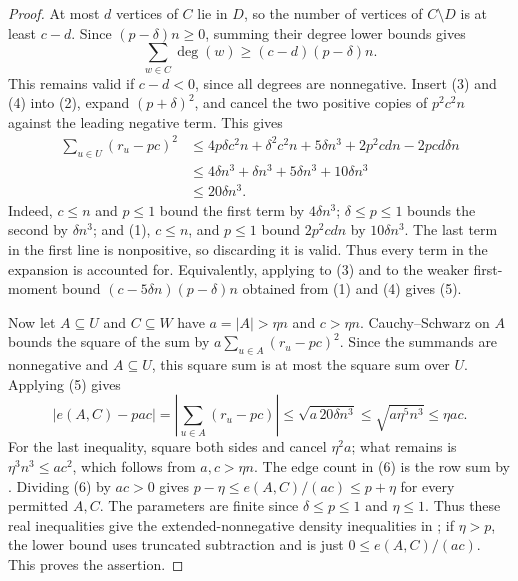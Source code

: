 \begin{proof}
At most $d$ vertices of $C$ lie in $D$, so the number of vertices of $C\setminus D$ is at least $c-d$. Since $(p-\delta)n\ge0$, summing their degree lower bounds gives
\[
 \sum_{w\in C}\deg(w)\ge(c-d)(p-\delta)n.                         \tag{4}
\]
This remains valid if $c-d<0$, since all degrees are nonnegative.
Insert (3) and (4) into (2), expand $(p+\delta)^2$, and cancel the two positive copies of $p^2c^2n$ against the leading negative term.  This gives
\begin{align*}
 \sum_{u\in U}(r_u-pc)^2
 &\le 4p\delta c^2n+\delta^2c^2n+5\delta n^3
       +2p^2cdn-2pcd\delta n\\
 &\le 4\delta n^3+\delta n^3+5\delta n^3+10\delta n^3\\
 &\le20\delta n^3.                                                \tag{5}
\end{align*}
Indeed, $c\le n$ and $p\le1$ bound the first term by $4\delta n^3$; $\delta\le p\le1$ bounds the second by $\delta n^3$; and (1), $c\le n$, and $p\le1$ bound $2p^2cdn$ by $10\delta n^3$.  The last term in the first line is nonpositive, so discarding it is valid.  Thus every term in the expansion is accounted for. Equivalently, applying  to (3) and to the weaker first-moment bound $(c-5\delta n)(p-\delta)n$ obtained from (1) and (4) gives (5).

Now let $A\subseteq U$ and $C\subseteq W$ have $a=|A|>\eta n$ and $c>\eta n$. Cauchy--Schwarz on $A$ bounds the square of the sum by $a\sum_{u\in A}(r_u-pc)^2$. Since the summands are nonnegative and $A\subseteq U$, this square sum is at most the square sum over $U$. Applying (5) gives
\[
 |e(A,C)-pac|=\left|\sum_{u\in A}(r_u-pc)\right|
 \le\sqrt{a\,20\delta n^3}
 \le\sqrt{a\eta^5n^3}\le\eta ac.                                \tag{6}
\]
For the last inequality, square both sides and cancel $\eta^2a$; what remains is $\eta^3n^3\le ac^2$, which follows from $a,c>\eta n$. The edge count in (6) is the row sum by . Dividing (6) by $ac>0$ gives $p-\eta\le e(A,C)/(ac)\le p+\eta$ for every permitted $A,C$. The parameters are finite since $\delta\le p\le1$ and $\eta\le1$. Thus these real inequalities give the extended-nonnegative density inequalities in ; if $\eta>p$, the lower bound uses truncated subtraction and is just $0\le e(A,C)/(ac)$. This proves the assertion.
\end{proof}
